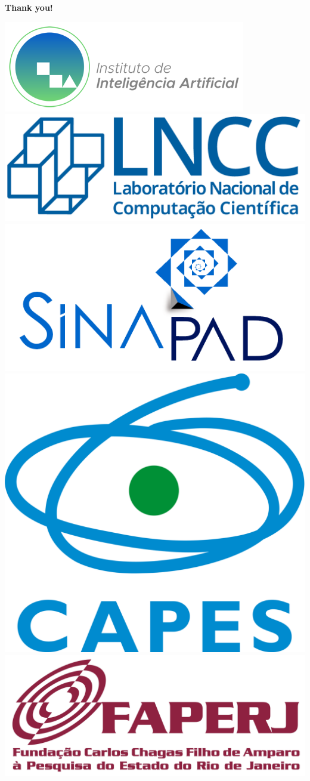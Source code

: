 \documentclass[aspectratio=169,xcolor=dvipsnames]{beamer}
\begin{document}
\begin{frame}
    \Huge{\centerline{\textbf{Thank you!}}}
    \vspace{1em}
    \begin{center}
        \includegraphics[height=1.cm]{imgs/logos/logo-instituto-ia.png}%
        \hspace{0.5cm}%
        \includegraphics[height=1.cm]{imgs/logos/lncc-logo.png}%
        \hspace{0.5cm}%
        \includegraphics[height=1.cm]{imgs/logos/logo-sinapad.png}
        \hspace{0.5cm}%
        \includegraphics[height=1.cm]{imgs/logos/logo-capes.png}%
        \hspace{0.5cm}%
        \includegraphics[height=1.cm]{imgs/logos/logo-faperj.jpg}%

    \end{center}
\end{frame}




\end{document}
